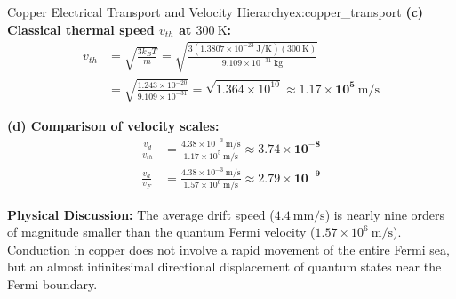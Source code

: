 \documentclass[11pt,a4paper]{article}
\begin{document}
\begin{examplebox}{Copper Electrical Transport and Velocity Hierarchy}{ex:copper_transport}
\textbf{(c) Classical thermal speed $v_{th}$ at $300\ \mathrm{K}$:}
\begin{align*}
v_{th} &= \sqrt{\frac{3 k_B T}{m}} = \sqrt{\frac{3(1.3807 \times 10^{-23}\ \mathrm{J/K})(300\ \mathrm{K})}{9.109 \times 10^{-31}\ \mathrm{kg}}} \\
&= \sqrt{\frac{1.243 \times 10^{-20}}{9.109 \times 10^{-31}}} = \sqrt{1.364 \times 10^{10}} \approx \mathbf{1.17 \times 10^5\ \mathrm{m/s}}
\end{align*}

\textbf{(d) Comparison of velocity scales:}
\begin{align*}
\frac{v_d}{v_{th}} &= \frac{4.38 \times 10^{-3}\ \mathrm{m/s}}{1.17 \times 10^5\ \mathrm{m/s}} \approx \mathbf{3.74 \times 10^{-8}} \\
\frac{v_d}{v_F} &= \frac{4.38 \times 10^{-3}\ \mathrm{m/s}}{1.57 \times 10^6\ \mathrm{m/s}} \approx \mathbf{2.79 \times 10^{-9}}
\end{align*}

\textbf{Physical Discussion:} The average drift speed ($4.4\ \mathrm{mm/s}$) is nearly nine orders of magnitude smaller than the quantum Fermi velocity ($1.57 \times 10^6\ \mathrm{m/s}$). Conduction in copper does not involve a rapid movement of the entire Fermi sea, but an almost infinitesimal directional displacement of quantum states near the Fermi boundary.
\end{examplebox}

\vspace{0.4cm}
\end{document}
